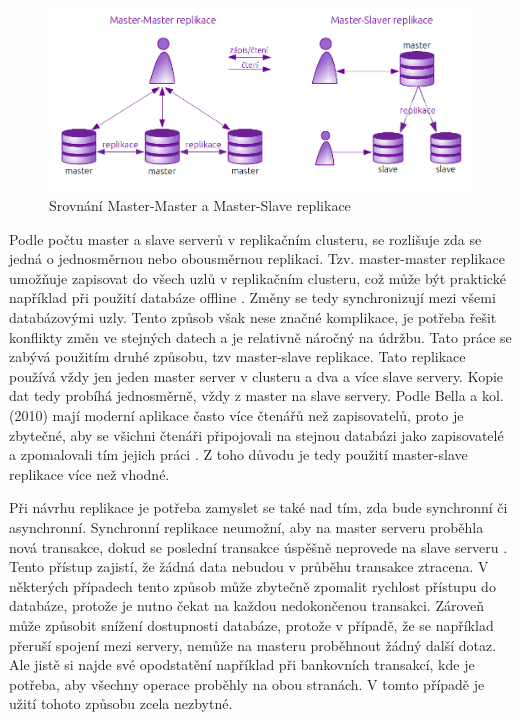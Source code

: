           \begin{figure}[H]
            \centering
            \includegraphics[scale=1]{../../../grafy/obr/schema_masterMasterSlave_maxiTence.png}
            \caption {Srovnání Master-Master a Master-Slave replikace}
            \label{srovnaniM-M-S}
          \end{figure}

          Podle počtu master a slave serverů v replikačním clusteru, se rozlišuje zda se jedná o jednosměrnou nebo obousměrnou replikaci. Tzv. master-master replikace umožňuje zapisovat do všech uzlů v replikačním clusteru, což může být praktické například při použití databáze offline . Změny se tedy synchronizují mezi všemi databázovými uzly. Tento způsob však nese značné komplikace, je potřeba řešit konflikty změn ve stejných datech a je relativně náročný na údržbu. Tato práce se zabývá použitím druhé způsobu, tzv master-slave replikace. Tato replikace používá vždy jen jeden master server v clusteru a dva a více slave servery. Kopie dat tedy probíhá jednosměrně, vždy z master na slave servery. Podle Bella a kol. (2010) mají moderní aplikace často více čtenářů než zapisovatelů, proto je zbytečné, aby se všichni čtenáři připojovali na stejnou databázi jako zapisovatelé a zpomalovali tím jejich práci \citep{BellKindahlThalmann2010}. Z toho důvodu je tedy použití master-slave replikace více než vhodné.

Při návrhu replikace je potřeba zamyslet se také nad tím, zda bude synchronní či asynchronní. Synchronní replikace neumožní, aby na master serveru proběhla nová transakce, dokud se poslední transakce úspěšně neprovede na slave serveru \citep{Boszormenyi2013}. Tento přístup zajistí, že žádná data nebudou v průběhu transakce ztracena. V některých případech tento způsob může zbytečně zpomalit rychlost přístupu do databáze, protože je nutno čekat na každou nedokončenou transakci. Zároveň může způsobit snížení dostupnosti databáze, protože v případě, že se například přeruší spojení mezi servery, nemůže na masteru proběhnout žádný další dotaz. Ale jistě si najde své opodstatění například při bankovních transakcí, kde je potřeba, aby všechny operace proběhly na obou stranách. V tomto případě je užití tohoto způsobu zcela nezbytné. 

